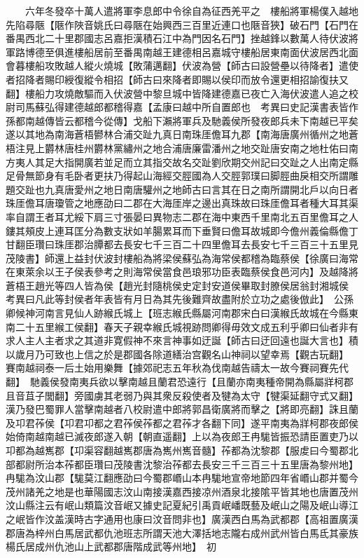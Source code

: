 　　六年冬發卒十萬人遣將軍李息郎中令徐自為征西羌平之　樓船將軍楊僕入越地先陷尋陿【陿作陜音姚氏曰尋陿在始興西三百里近連口也陿音狹】破石門【石門在番禺西北二十里郡國志呂嘉拒漢積石江中為門因名石門】挫越鋒以數萬人待伏波將軍路博德至俱進樓船居前至番禺南越王建德相呂嘉城守樓船居東南面伏波居西北面會暮樓船攻敗越人縱火燒城【敗蒲邁翻】伏波為營【師古曰設營壘以待降者】遣使者招降者賜印綬復縱令相招【師古曰來降者即賜以侯印而放令還更相招諭復扶又翻】樓船力攻燒敵驅而入伏波營中黎旦城中皆降建德嘉已夜亡入海伏波遣人追之校尉司馬蘇弘得建德越郎都稽得嘉【孟康曰越中所自置郎也　考異曰史記漢書表皆作孫都南越傳皆云都稽今從傳】戈船下瀨將軍兵及馳義侯所發夜郎兵未下南越已平矣遂以其地為南海蒼梧鬰林合浦交趾九真日南珠厓儋耳九郡【南海唐廣州循州之地蒼梧注見上欝林唐桂州欝林黨繡州之地合浦唐廉雷潘州之地交趾唐安南之地杜佑曰南方夷人其足大指開廣若並足而立其指交故名交趾劉欣期交州記曰交趾之人出南定縣足骨無節身有毛卧者更扶乃得起山海經交脛國為人交脛郭璞曰脚脛曲戾相交所謂雕題交趾也九真唐愛州之地日南唐驩州之地師古曰言其在日之南所謂開北戶以向日者珠厓儋耳唐瓊管之地應劭曰二郡在大海厓岸之邊出真珠故曰珠厓儋耳者種大耳其渠率自謂王者耳尤綏下肩三寸張晏曰異物志二郡在海中東西千里南北五百里儋耳之人鏤其頰皮上連耳匡分為數支狀如羊腸累耳而下垂賢曰儋耳故城即今儋州義倫縣儋丁甘翻臣瓚曰珠厓郡治䐺都去長安七千三百二十四里儋耳去長安七千三百三十五里見茂陵書】師還上益封伏波封樓船為將梁侯蘇弘為海常侯都稽為臨蔡侯【徐廣曰海常在東萊余以王子侯表參考之則海常侯當食邑琅邪功臣表臨蔡侯食邑河内】及越降將蒼梧王趙光等四人皆為侯【趙光封隨桃侯史定封安道侯畢取封膫侯居翁封湘城侯　考異曰凡此等封侯者年表皆有月日為其先後難齊故盡附於立功之處後倣此】　公孫卿候神河南言見仙人跡緱氏城上【班志緱氏縣屬河南郡宋白曰漢緱氏故城在今縣東南二十五里緱工侯翻】春天子親幸緱氏城視跡問卿得毋效文成五利乎卿曰仙者非有求人主人主者求之其道非寛假神不來言神事如迂誕【師古曰迂回遠也誕大言也】積以歲月乃可致也上信之於是郡國各除道繕治宫觀名山神祠以望幸焉【觀古玩翻】　賽南越祠泰一后土始用樂舞【據郊祀志五年秋為伐南越告禱太一故今賽祠賽先代翻】　馳義侯發南夷兵欲以擊南越且蘭君恐遠行【且蘭亦南夷種帝開為縣屬牂柯郡且音苴子閭翻】旁國虜其老弱乃與其衆反殺使者及犍為太守【犍渠延翻守式又翻】漢乃發巴蜀罪人當擊南越者八校尉遣中郎將郭昌衛廣將而擊之【將即亮翻】誅且蘭及卭君莋侯【卭君卭都之君莋侯莋都之君莋才各翻下同】遂平南夷為牂柯郡夜郎侯始倚南越南越已滅夜郎遂入朝【朝直遥翻】上以為夜郎王冉駹皆振恐請臣置吏乃以卭都為越嶲郡【卭渠容翻越嶲郡唐為嶲州嶲音髓】莋都為沈黎郡【服䖍曰今蜀郡北部都尉所治本莋都臣瓚曰茂陵書沈黎治莋都去長安三千三百三十五里唐為黎州地】冉駹為汶山郡【駹莫江翻應劭曰今蜀郡㟭山本冉駹地宣帝地節四年省㟭山郡并蜀今茂州諸羌之地是也華陽國志汶山南接漢嘉西接凉州酒泉北接隂平皆其地也唐置茂州汶山縣注云有岷山類篇汶音岷又據史記夏紀引禹貢岷嶓既藝及岷山之陽及岷山導江之岷皆作汶盖漢時古字通用也康曰汶音問非也】廣漢西白馬為武都郡【高祖置廣漢郡唐為梓州白馬居武都仇池班志所謂天池大澤括地志隴右成州武州皆白馬氐其豪族楊氏居成州仇池山上武都郡唐階成武等州地】　初

